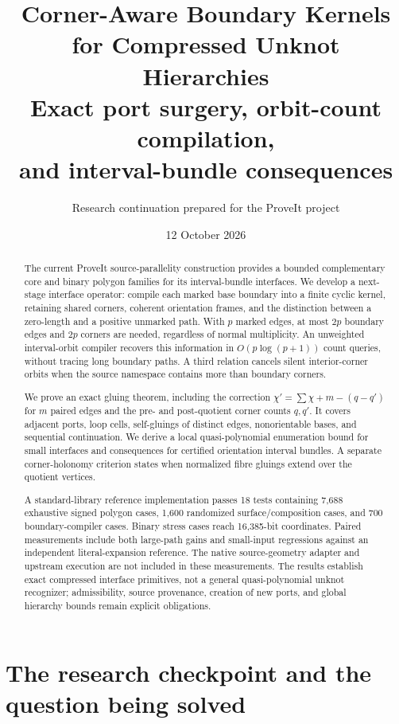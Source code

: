 \documentclass[11pt]{article}
\title{\textbf{Corner-Aware Boundary Kernels\\for Compressed Unknot Hierarchies}\\[7pt]
\large Exact port surgery, orbit-count compilation,\\and interval-bundle consequences}
\author{Research continuation prepared for the ProveIt project}
\date{12 October 2026}
\theoremstyle{definition}
\theoremstyle{remark}\newtheorem{remark}[theorem]{Remark}
\begin{document}
\maketitle
\begin{abstract}
The current ProveIt source-parallelity construction provides a bounded complementary core and binary polygon families for its interval-bundle interfaces. We develop a next-stage interface operator: compile each marked base boundary into a finite cyclic kernel, retaining shared corners, coherent orientation frames, and the distinction between a zero-length and a positive unmarked path. With $p$ marked edges, at most $2p$ boundary edges and $2p$ corners are needed, regardless of normal multiplicity. An unweighted interval-orbit compiler recovers this information in $O(p\log(p+1))$ count queries, without tracing long boundary paths. A third relation cancels silent interior-corner orbits when the source namespace contains more than boundary corners.

We prove an exact gluing theorem, including the correction
$\chi'=\sum\chi+m-(q-q')$ for $m$ paired edges and the pre- and post-quotient corner counts $q,q'$. It covers adjacent ports, loop cells, self-gluings of distinct edges, nonorientable bases, and sequential continuation. We derive a local quasi-polynomial enumeration bound for small interfaces and consequences for certified orientation interval bundles. A separate corner-holonomy criterion states when normalized fibre gluings extend over the quotient vertices.

A standard-library reference implementation passes 18 tests containing 7,688 exhaustive signed polygon cases, 1,600 randomized surface/composition cases, and 700 boundary-compiler cases. Binary stress cases reach 16,385-bit coordinates. Paired measurements include both large-path gains and small-input regressions against an independent literal-expansion reference. The native source-geometry adapter and upstream execution are not included in these measurements. The results establish exact compressed interface primitives, not a general quasi-polynomial unknot recognizer; admissibility, source provenance, creation of new ports, and global hierarchy bounds remain explicit obligations.
\end{abstract}
\newpage
{\small\setlength{\parskip}{0pt}\tableofcontents}
\newpage

\section{The research checkpoint and the question being solved}
\label{sec:checkpoint}
\end{document}
